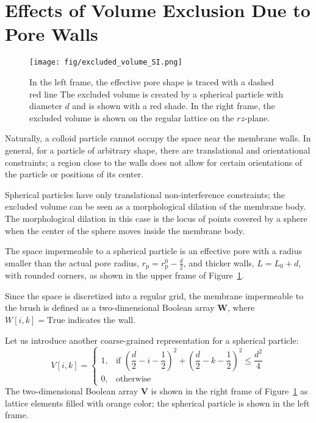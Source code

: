 \documentclass[10pt, a4paper]{article}
\begin{document}
\section{Effects of Volume Exclusion Due to Pore Walls}

\begin{multicols}{2}

\begin{figure}[H]
    \centering
    \texttt{[image: fig/excluded\_volume\_SI.png]}
    \caption{
        In the left frame, the effective pore shape is traced with a dashed red line
        The excluded volume is created by a spherical particle with diameter $d$ and is shown with a red shade.
        In the right frame, the excluded volume is shown on the regular lattice on the $rz$-plane.
        }
    \label{fig:excluded_volume}
\end{figure}

Naturally, a colloid particle cannot occupy the space near the membrane walls.
In general, for a particle of arbitrary shape, there are translational and orientational constraints; a region close to the walls does not allow for certain orientations of the particle or positions of its center.

Spherical particles have only translational non-interference constraints; the excluded volume can be seen as a morphological dilation of the membrane body.
The morphological dilation in this case is the locus of points covered by a sphere when the center of the sphere moves inside the membrane body.

The space impermeable to a spherical particle is an effective pore with a radius smaller than the actual pore radius, $r_{\text{p}} = r_{\text{p}}^{0} - \frac{d}{2}$, and thicker walls, $L = L_{0} + d$, with rounded corners, as shown in the upper frame of Figure~\ref{fig:excluded_volume}.

Since the space is discretized into a regular grid, the membrane impermeable to the brush is defined as a two-dimensional Boolean array $\bm{W}$, where $W[i, k] = \text{True}$ indicates the wall.

Let us introduce another coarse-grained representation for a spherical particle:
\begin{equation}
    V[i, k] = 
    \begin{cases}
            1, & \text{if } \left( \dfrac{d}{2} - i - \dfrac{1}{2} \right)^2 + \left( \dfrac{d}{2} - k - \dfrac{1}{2} \right)^2 \le \dfrac{d^2}{4} \\
            0, & \text{otherwise}
        \end{cases}
\end{equation}
The two-dimensional Boolean array $\bm{V}$ is shown in the right frame of Figure~\ref{fig:excluded_volume} as lattice elements filled with orange color; the spherical particle is shown in the left frame.


\end{multicols}
\end{document}
